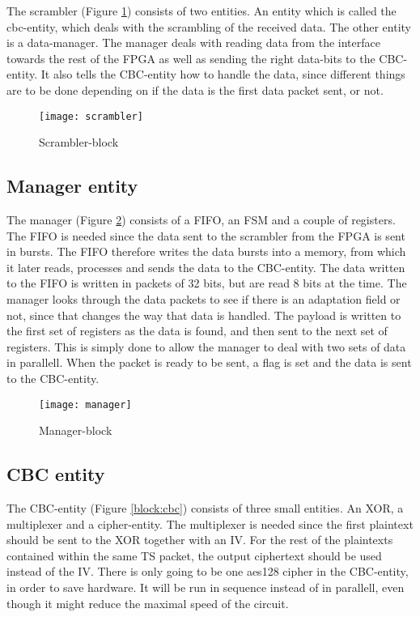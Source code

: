 The scrambler (Figure \ref{block:scrambler}) consists of two entities. 
An entity which is called the cbc-entity, which deals with the 
scrambling of the received data. The other entity is a data-manager. 
The manager deals with reading data from the interface towards the rest 
of the FPGA as well as sending the right data-bits to the CBC-entity. 
It also tells the CBC-entity how to handle the data, since different 
things are to be done depending on if the data is the first data packet 
sent, or not.

\begin{figure}[h!]
  \centering
  \texttt{[image: scrambler]}
  \caption{Scrambler-block}
  \label{block:scrambler}
\end{figure}

\subsection{Manager entity}
The manager (Figure \ref{block:manager}) consists of a FIFO, an FSM and 
a couple of registers. The FIFO is needed since the data sent to the 
scrambler from the FPGA is sent in bursts. The FIFO therefore writes 
the data bursts into a memory, from which it later reads, processes and 
sends the data to the CBC-entity. The data written to the FIFO is 
written in packets of 32 bits, but are read 8 bits at the time. The 
manager looks through the data packets to see if there is an adaptation 
field or not, since that changes the way that data is handled. The 
payload is written to the first set of registers as the data is found, 
and then sent to the next set of registers. This is simply done to 
allow the manager to deal with two sets of data in parallell. When the 
packet is ready to be sent, a flag is set and the data is sent to the 
CBC-entity. 

\begin{figure}[h!]
  \centering
  \texttt{[image: manager]}
  \caption{Manager-block}
  \label{block:manager}
\end{figure}

\subsection{CBC entity}
The CBC-entity (Figure \ref{block:cbc}) consists of three small 
entities. An XOR, a multiplexer and a cipher-entity. The multiplexer is 
needed since the first plaintext should be sent to the XOR together 
with an IV. For the rest of the plaintexts contained within the same 
TS packet, the output ciphertext should be used instead of the IV. 
There is only going to be one aes128 cipher in the CBC-entity, in order 
to save hardware. It will be run in sequence instead of in parallell, 
even though it might reduce the maximal speed of the circuit.

